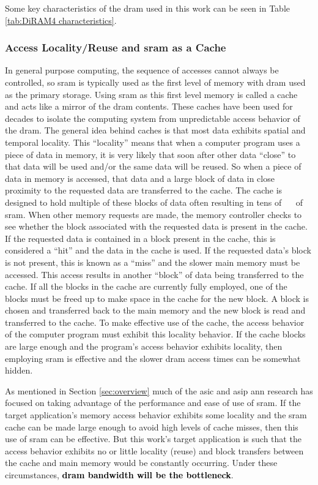 Some key characteristics of the \ac{dram} used in this work can be seen in Table \ref{tab:DiRAM4 characteristics}. 


\subsubsection{Access Locality/Reuse and \ac{sram} as a Cache}
\label{Access Locality/Reuse and Cache}

In general purpose computing, the sequence of accesses cannot always be controlled, so \ac{sram} is typically used as the first level of memory with \ac{dram} used as the primary storage. 
Using \ac{sram} as this first level memory is called a cache and acts like a mirror of the \ac{dram} contents.
These caches have been used for decades to isolate the computing system from unpredictable access behavior of the \ac{dram}.
The general idea behind caches is that most data exhibits spatial and temporal locality. This ``locality'' means that when a computer program uses a piece of data in memory, it is very likely that soon after other data ``close'' to that data will be used and/or the same data will be reused.
So when a piece of data in memory is accessed, that data and a large block of data in close proximity to the requested data are transferred to the cache. 
The cache is designed to hold multiple of these blocks of data often resulting in tens of \SI[per-mode=symbol]{}{\kilo \byte} of \ac{sram}.
When other memory requests are made, the memory controller checks to see whether the block associated with the requested data is present in the cache.
If the requested data is contained in a block present in the cache, this is considered a ``hit'' and the data in the cache is used. 
If the requested data's block is not present, this is known as a ``miss'' and the slower main memory must be accessed. This access results in another ``block'' of data being transferred to the cache.
If all the blocks in the cache are currently fully employed, one of the blocks must be freed up to make space in the cache for the new block. 
A block is chosen and transferred back to the main memory and the new block is read and transferred to the cache.
To make effective use of the cache, the access behavior of the computer program must exhibit this locality behavior. 
If the cache blocks are large enough and the program's access behavior exhibits locality, then employing \ac{sram} is effective and the slower \ac{dram} access times can be somewhat hidden.

As mentioned in Section \ref{sec:overview} much of the \ac{asic} and \ac{asip} \ac{ann} research has focused on taking advantage of the performance and ease of use of \ac{sram}. 
If the target application's memory access behavior exhibits some locality and the \ac{sram} cache can be made large enough to avoid high levels of cache misses, then this use of \ac{sram} can be effective.
But this work's target application is such that the access behavior exhibits no or little locality (reuse) and block transfers between the cache and main memory would be constantly occurring.
Under these circumstances, \textbf{\textcolor{black}{\ac{dram} bandwidth will be the bottleneck}}.

